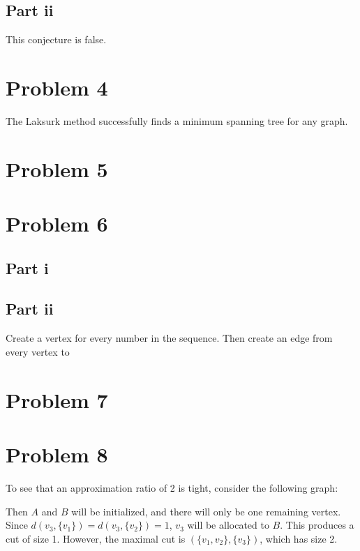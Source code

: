 \documentclass[twoside]{amsart}
\begin{document}
\subsection*{Part ii}

This conjecture is false.



\section*{Problem 4}

The Laksurk method successfully finds a minimum spanning tree for any
graph.  


\section*{Problem 5}


\section*{Problem 6}

\subsection*{Part i}

\subsection*{Part ii}

Create a vertex for every number in the sequence.  Then create an edge
from every vertex to 

\section*{Problem 7}


\section*{Problem 8}

To see that an approximation ratio of 2 is tight, consider the
following graph:


Then $A$ and $B$ will be initialized, and there will only be one
remaining vertex.  Since $d(v_3,\{v_1\}) = d(v_3,\{v_2\}) = 1$, $v_3$
will be allocated to $B$.  This produces a cut of size 1.  However,
the maximal cut is $(\{v_1,v_2\},\{v_3\})$, which has size 2.
\end{document}
